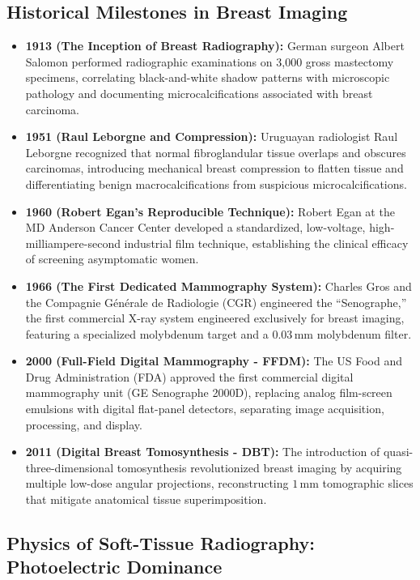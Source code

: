 \documentclass[11pt,a4paper]{article}
\begin{document}
\subsection{Historical Milestones in Breast Imaging}

\begin{itemize}[leftmargin=*]
    \item \textbf{1913 (The Inception of Breast Radiography):} German surgeon Albert Salomon performed radiographic examinations on 3,000 gross mastectomy specimens, correlating black-and-white shadow patterns with microscopic pathology and documenting microcalcifications associated with breast carcinoma.
    \item \textbf{1951 (Raul Leborgne and Compression):} Uruguayan radiologist Raul Leborgne recognized that normal fibroglandular tissue overlaps and obscures carcinomas, introducing mechanical breast compression to flatten tissue and differentiating benign macrocalcifications from suspicious microcalcifications.
    \item \textbf{1960 (Robert Egan's Reproducible Technique):} Robert Egan at the MD Anderson Cancer Center developed a standardized, low-voltage, high-milliampere-second industrial film technique, establishing the clinical efficacy of screening asymptomatic women.
    \item \textbf{1966 (The First Dedicated Mammography System):} Charles Gros and the Compagnie Générale de Radiologie (CGR) engineered the ``Senographe,'' the first commercial X-ray system engineered exclusively for breast imaging, featuring a specialized molybdenum target and a $0.03\,\text{mm}$ molybdenum filter.
    \item \textbf{2000 (Full-Field Digital Mammography - FFDM):} The US Food and Drug Administration (FDA) approved the first commercial digital mammography unit (GE Senographe 2000D), replacing analog film-screen emulsions with digital flat-panel detectors, separating image acquisition, processing, and display.
    \item \textbf{2011 (Digital Breast Tomosynthesis - DBT):} The introduction of quasi-three-dimensional tomosynthesis revolutionized breast imaging by acquiring multiple low-dose angular projections, reconstructing $1\,\text{mm}$ tomographic slices that mitigate anatomical tissue superimposition.
\end{itemize}

\subsection{Physics of Soft-Tissue Radiography: Photoelectric Dominance}
\end{document}
